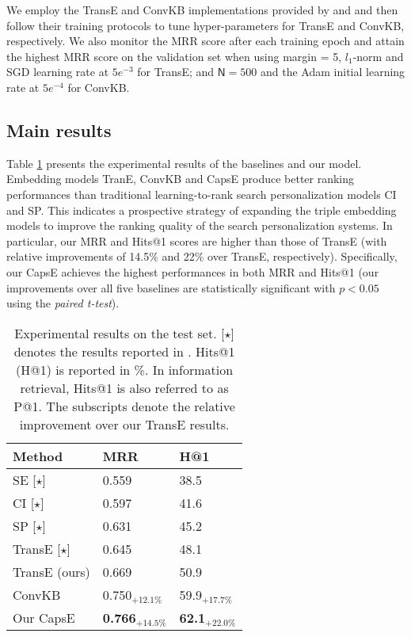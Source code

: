 \documentclass[11pt,a4paper]{article}
\begin{document}
We employ the TransE and ConvKB implementations provided by \citet{NguyenNAACL2016} and \citet{Nguyen2018} and then follow their training protocols to tune hyper-parameters for TransE and ConvKB, respectively.
We also monitor the MRR score after each training epoch and attain the highest MRR score on the validation set when using 
margin = 5, $l_1$-norm and SGD learning rate at $5e^{-3}$ for TransE; and 
$\mathsf{N} = 500$
and the Adam initial learning rate at $5e^{-4}$ for ConvKB. 

\subsection{Main  results}
Table \ref{tab:resultssp} presents the experimental results of the baselines and our model. 
Embedding models TranE, ConvKB and CapsE produce better ranking performances than  traditional learning-to-rank search personalization models CI and SP.
This indicates a prospective strategy of expanding the triple embedding models to improve the ranking quality of the search personalization systems. 
In particular, our MRR and Hits@1 scores are higher than those of TransE (with relative improvements of 14.5\% and 22\% over TransE, respectively). 
Specifically, our CapsE achieves the highest performances in both MRR and Hits@1 (our improvements over all five baselines are statistically significant with $p < 0.05$ using the \textit{paired t-test}). 



\begin{table}[!t]
\centering
\begin{tabular}{l|ll}
\hline
\textbf{Method} & \textbf{MRR} & \textbf{H@1}\\
\hline
SE [$\star$]  & 0.559 & 38.5 \\
CI [$\star$]  & 0.597 & 41.6 \\
SP [$\star$]  & 0.631 & 45.2 \\
TransE [$\star$]  & 0.645 & 48.1 \\
\hline
TransE (ours) & 0.669 & 50.9 \\
ConvKB & 0.750$_{+12.1\%}$ & 59.9$_{+17.7\%}$ \\
\hline
Our CapsE & \textbf{0.766}$_{+14.5\%}$ & \textbf{62.1}$_{+22.0\%}$ \\
\hline
\end{tabular}
\caption{Experimental results on the test set. [$\star$] denotes the results reported in  \citep{vu2017search}. Hits@1  (H@1) is reported in \%. In information retrieval, Hits@1 is also referred to as P@1. The subscripts denote the relative improvement over our TransE results.} 
\label{tab:resultssp}
\end{table}
\end{document}
